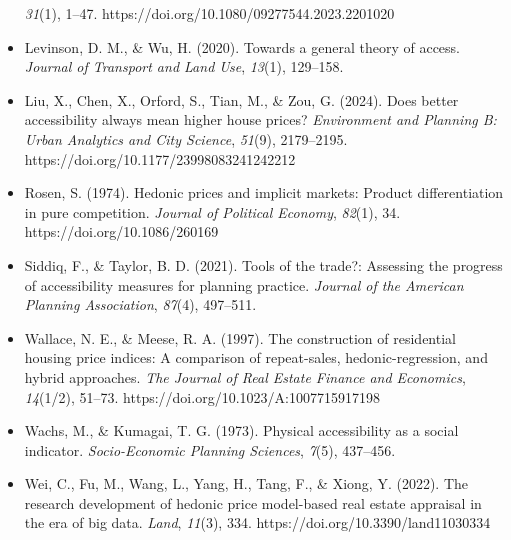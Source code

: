 \documentclass[
  12pt,
]{report}
\begin{document}
\begin{itemize}
  \emph{31}(1), 1--47. https://doi.org/10.1080/09277544.2023.2201020
\item
  Levinson, D. M., \& Wu, H. (2020). Towards a general theory of access.
  \emph{Journal of Transport and Land Use}, \emph{13}(1), 129--158.
\item
  Liu, X., Chen, X., Orford, S., Tian, M., \& Zou, G. (2024). Does
  better accessibility always mean higher house prices?
  \emph{Environment and Planning B: Urban Analytics and City Science},
  \emph{51}(9), 2179--2195. https://doi.org/10.1177/23998083241242212
\item
  Rosen, S. (1974). Hedonic prices and implicit markets: Product
  differentiation in pure competition. \emph{Journal of Political
  Economy}, \emph{82}(1), 34. https://doi.org/10.1086/260169
\item
  Siddiq, F., \& Taylor, B. D. (2021). Tools of the trade?: Assessing
  the progress of accessibility measures for planning practice.
  \emph{Journal of the American Planning Association}, \emph{87}(4),
  497--511.
\item
  Wallace, N. E., \& Meese, R. A. (1997). The construction of
  residential housing price indices: A comparison of repeat-sales,
  hedonic-regression, and hybrid approaches. \emph{The Journal of Real
  Estate Finance and Economics}, \emph{14}(1/2), 51--73.
  https://doi.org/10.1023/A:1007715917198
\item
  Wachs, M., \& Kumagai, T. G. (1973). Physical accessibility as a
  social indicator. \emph{Socio-Economic Planning Sciences},
  \emph{7}(5), 437--456.
\item
  Wei, C., Fu, M., Wang, L., Yang, H., Tang, F., \& Xiong, Y. (2022).
  The research development of hedonic price model-based real estate
  appraisal in the era of big data. \emph{Land}, \emph{11}(3), 334.
  https://doi.org/10.3390/land11030334
\end{itemize}
\end{document}
